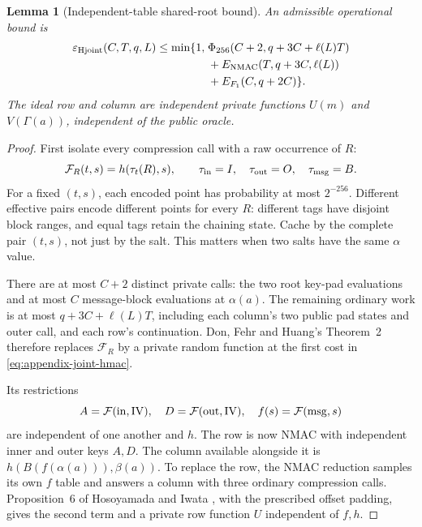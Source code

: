 \documentclass[pdflatex]{sn-jnl}
\theoremstyle{thmstyleone}
\newtheorem{lemma}[theorem]{Lemma}
\theoremstyle{thmstylethree}
\theoremstyle{thmstyletwo}
\begin{document}
\begin{lemma}[Independent-table shared-root bound]
\label{lem:appendix-joint-hmac}
An admissible operational bound is
\begin{equation}
\begin{split}
 \varepsilon_{\rm Hjoint}(C,T,q,L)\le\min\{1,\;&
 \Phi_{256}(C+2,q+3C+\ell(L)T)\\
 &+E_{\rm NMAC}(T,q+3C,\ell(L))\\
 &+E_{F_1}(C,q+2C)\}.
\end{split}
 \label{eq:appendix-joint-hmac}
\end{equation}
The ideal row and column are independent private functions
$U(m)$ and $V(\Gamma(a))$, independent of the public oracle.
\end{lemma}
\begin{proof}
First isolate every compression call with a raw occurrence of $R$:
\[
 \mathcal F_R(t,s)=h(\tau_t(R),s),
 \qquad \tau_{\rm in}=I,\quad\tau_{\rm out}=O,\quad\tau_{\rm msg}=B.
\]
For a fixed $(t,s)$, each encoded point has probability at most $2^{-256}$.
Different effective pairs encode different points for every $R$:
different tags have disjoint block ranges, and equal tags retain the
chaining state. Cache by the complete pair $(t,s)$, not just by the salt.
This matters when two salts have the same $\alpha$ value.

There are at most $C+2$ distinct private calls: the two root key-pad
evaluations and at most $C$ message-block evaluations at $\alpha(a)$.
The remaining ordinary work is at most $q+3C+\ell(L)T$, including each
column's two public pad states and outer call, and each row's continuation.
Don, Fehr and Huang's Theorem~2~\cite{dfh2022} therefore replaces
$\mathcal F_R$ by a private random function at the first cost in
\eqref{eq:appendix-joint-hmac}.

Its restrictions
\[
 A=\mathcal F({\rm in},\mathrm{IV}),\quad
 D=\mathcal F({\rm out},\mathrm{IV}),\quad
 f(s)=\mathcal F({\rm msg},s)
\]
are independent of one another and $h$. The row is now NMAC with independent
inner and outer keys $A,D$. The column available alongside it is
$h(B(f(\alpha(a))),\beta(a))$. To replace the row, the NMAC reduction
samples its own $f$ table and answers a column with three ordinary
compression calls. Proposition~6 of Hosoyamada and Iwata
\cite{hmacqrom2021}, with the prescribed offset padding, gives the second
term and a private row function $U$ independent of $f,h$.


\end{proof}
\end{document}

